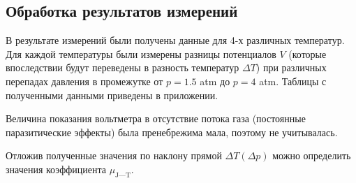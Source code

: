 \documentclass[a4paper,12pt]{report}
\begin{document}
    \newpage
    \begin{multicols}{2}
    \section{Обработка результатов измерений}
        В результате измерений были получены данные для 4-х различных температур. Для каждой температуры были измерены разницы потенциалов $V$ (которые впоследствии будут переведены в разность температур $\Delta T$) при различных перепадах давления в промежутке от $p=1.5$ atm до $p=4$ atm. Таблицы с полученными данными приведены в приложении.
        
        Величина показания вольтметра в отсутствие потока газа  (постоянные паразитические эффекты) была пренебрежима мала, поэтому не учитывалась.

        Отложив полученные значения по наклону прямой $\Delta T (\Delta p)$ можно определить значения коэффициента $\mu_{\text{J---T}}$.
    \end{multicols}
\end{document}
